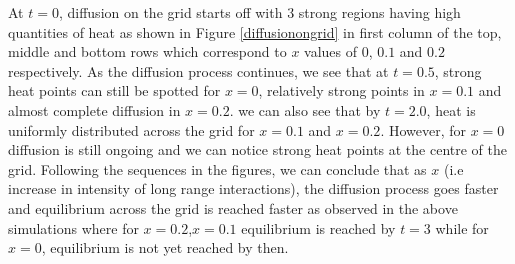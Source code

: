 \documentclass[10pt,a4paper]{article}
\begin{document}
At $t=0$, diffusion on the grid starts off with $3$ strong regions having high quantities of heat as shown in Figure \ref{diffusionongrid} in first column of the top, middle and bottom rows which correspond to $x$ values of $0$, $0.1$ and $0.2$ respectively. As the diffusion process continues, we see that at $t=0.5$, strong heat points can still be spotted for $x=0$, relatively strong points in $x=0.1$ and almost complete diffusion in $x=0.2$. we can also see that by $t=2.0$, heat is uniformly distributed across the grid for $x=0.1$ and $x=0.2$. However, for $x=0$ diffusion is still ongoing and we can notice strong heat points at the centre of the grid. Following the sequences in the figures, we can conclude that as $x$ (i.e increase in intensity of long range interactions), the diffusion process goes faster and equilibrium across the grid is reached faster as observed in the above simulations where for $x=0.2$,$x=0.1$ equilibrium is reached by $t=3$ while for $x=0$, equilibrium is not yet reached by then.





\nocite{*}


\end{document}
